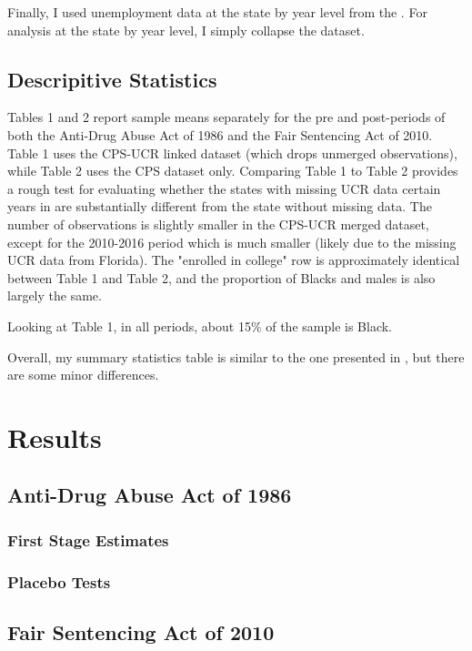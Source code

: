 \documentclass{article}
\begin{document}
Finally, I used unemployment data at the state by year level from the \cite{unemployment_data}. For analysis at the state by year level, I simply collapse the dataset.

\subsection{Descripitive Statistics}

Tables 1 and 2 report sample means separately for the pre and post-periods of both the Anti-Drug Abuse Act of 1986 and the Fair Sentencing Act of 2010. Table 1 uses the CPS-UCR linked dataset (which drops unmerged observations), while Table 2 uses the CPS dataset only. Comparing Table 1 to Table 2 provides a rough test for evaluating whether the states with missing UCR data certain years in are substantially different from the state without missing data. The number of observations is slightly smaller in the CPS-UCR merged dataset, except for the 2010-2016 period which is much smaller (likely due to the missing UCR data from Florida). The "enrolled in college" row is approximately identical between Table 1 and Table 2, and the proportion of Blacks and males is also largely the same.

Looking at Table 1, in all periods, about 15\% of the sample is Black.

Overall, my summary statistics table is similar to the one presented in \cite{britton2022}, but there are some minor differences.

\section{Results}

\subsection{Anti-Drug Abuse Act of 1986}

\subsubsection{First Stage Estimates}

\subsubsection{Placebo Tests}

\subsection{Fair Sentencing Act of 2010}
\end{document}
